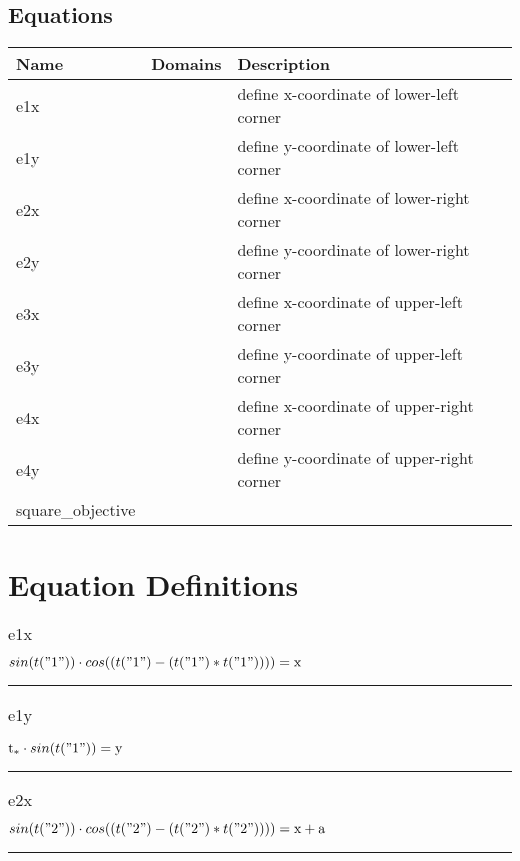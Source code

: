 \documentclass[11pt]{article}
\begin{document}
\subsection*{Equations}
\begin{tabularx}{\textwidth}{| l | l | X |}
\hline
\textbf{Name} & \textbf{Domains} & \textbf{Description}\\
\hline
\endhead

e1x &  & define x-coordinate of lower-left corner\\
e1y &  & define y-coordinate of lower-left corner\\
e2x &  & define x-coordinate of lower-right corner\\
e2y &  & define y-coordinate of lower-right corner\\
e3x &  & define x-coordinate of upper-left corner\\
e3y &  & define y-coordinate of upper-left corner\\
e4x &  & define x-coordinate of upper-right corner\\
e4y &  & define y-coordinate of upper-right corner\\
square\_objective &  & \\
\hline
\end{tabularx}
\section*{Equation Definitions}
\subsubsection*{\begin{math}\text{e1x}\end{math}}
\begin{math}
 sin(t("1"))  \cdot  cos((t("1") - (t("1") * t("1"))))  = \text{x}
\end{math}
\vspace{5pt}
\hrule
\subsubsection*{\begin{math}\text{e1y}\end{math}}
\begin{math}
\text{t}_{*} \cdot  sin(t("1"))  = \text{y}
\end{math}
\vspace{5pt}
\hrule
\subsubsection*{\begin{math}\text{e2x}\end{math}}
\begin{math}
 sin(t("2"))  \cdot  cos((t("2") - (t("2") * t("2"))))  = \text{x} + \text{a}
\end{math}
\vspace{5pt}
\hrule
\end{document}
